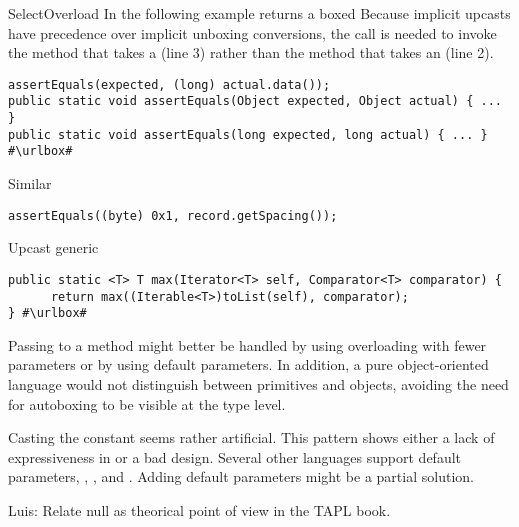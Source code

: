 \begin{pattern}{SelectOverload}
In the following example%
\def\urlvar{http://bit.ly/spullara_redis_protocol_2FC9Llb}
 returns a boxed 
Because implicit upcasts have precedence over implicit unboxing conversions,
the call is needed to invoke the method that takes a 
  (line 3)
  rather than the method that takes an  (line 2).
%
\begin{verbatim}
assertEquals(expected, (long) actual.data());
public static void assertEquals(Object expected, Object actual) { ... }
public static void assertEquals(long expected, long actual) { ... }
#\urlbox#
\end{verbatim}


Similar%
\def\urlvar{http://bit.ly/apache_poi_2StrlOn}

\begin{verbatim}
assertEquals((byte) 0x1, record.getSpacing());
\end{verbatim}

Upcast generic%
\def\urlvar{http://bit.ly/groovy_groovy_core_2HDAkbF}

\begin{verbatim}
public static <T> T max(Iterator<T> self, Comparator<T> comparator) {
      return max((Iterable<T>)toList(self), comparator);
} #\urlbox#
\end{verbatim}

\discussion{}
  Passing  to a method might better be handled by using overloading
  with fewer parameters or by using default parameters.
  In addition, a pure object-oriented language would not distinguish between primitives and 
  objects, avoiding the need for autoboxing to be visible at the type level.

Casting the  constant seems rather artificial.
This pattern shows either a lack of expressiveness in \java{} or
a bad \api{} design.
Several other languages support default parameters, \eg{},
\scala{}, \csharp{} and \cpp{}.
Adding default parameters might be a partial solution.

Luis: Relate null as theorical point of view in the TAPL book.

\end{pattern}